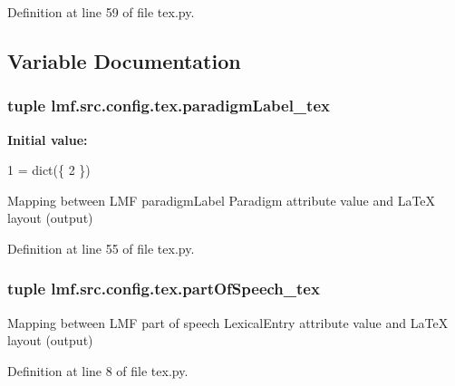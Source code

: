 Definition at line 59 of file tex.\+py.



\subsection{Variable Documentation}
\hypertarget{namespacelmf_1_1src_1_1config_1_1tex_a2a4c92ffc93b18380a5eb8971c518776}{
\subsubsection[{paradigm\+Label\+\_\+tex}]{\setlength{\rightskip}{0pt plus 5cm}tuple lmf.\+src.\+config.\+tex.\+paradigm\+Label\+\_\+tex}}\label{namespacelmf_1_1src_1_1config_1_1tex_a2a4c92ffc93b18380a5eb8971c518776}
{\bfseries Initial value\+:}
\begin{DoxyCode}
1 = dict(\{
2 \})
\end{DoxyCode}


Mapping between L\+M\+F paradigm\+Label Paradigm attribute value and La\+Te\+X layout (output) 



Definition at line 55 of file tex.\+py.

\hypertarget{namespacelmf_1_1src_1_1config_1_1tex_a94016d28cbde962dd9dee1465bf19548}{
\subsubsection[{part\+Of\+Speech\+\_\+tex}]{\setlength{\rightskip}{0pt plus 5cm}tuple lmf.\+src.\+config.\+tex.\+part\+Of\+Speech\+\_\+tex}}\label{namespacelmf_1_1src_1_1config_1_1tex_a94016d28cbde962dd9dee1465bf19548}


Mapping between L\+M\+F part of speech Lexical\+Entry attribute value and La\+Te\+X layout (output) 



Definition at line 8 of file tex.\+py.

